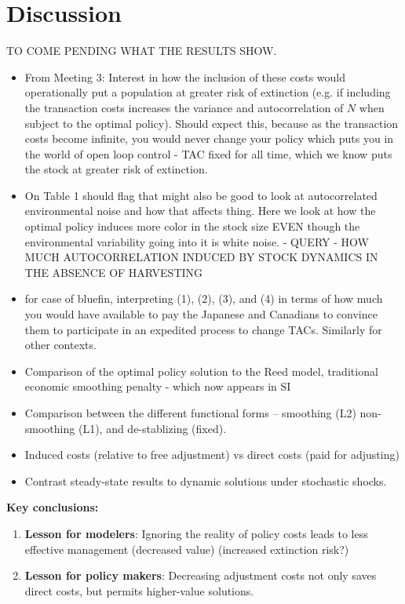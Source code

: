 \documentclass{article}\usepackage[]{graphicx}\usepackage[]{color}
\begin{document}
\section{Discussion}
TO COME PENDING WHAT THE RESULTS SHOW.
\begin{itemize}
\item From Meeting 3: Interest in how the inclusion of these costs would operationally put a population at greater risk of extinction (e.g. if including the transaction costs increases the variance and autocorrelation of $N$ when subject to the optimal policy). Should expect this, because as the transaction costs become infinite, you would never change your policy which puts you in the world of open loop control - TAC fixed for all time, which we know puts the stock at greater risk of extinction.
\item On Table 1 should flag that might also be good to look at autocorrelated environmental noise and how that affects thing. Here we look at how the optimal policy induces more color in the stock size EVEN though the environmental variability going into it is white noise. - QUERY - HOW MUCH AUTOCORRELATION INDUCED BY STOCK DYNAMICS IN THE ABSENCE OF HARVESTING
\item for case of bluefin, interpreting  (1), (2), (3), and (4) in terms of how much you would have available to pay the Japanese and Canadians to convince them to participate in an expedited process to change TACs. Similarly for other contexts.
\item   Comparison of the optimal policy solution to the Reed model, traditional economic smoothing penalty - which now appears in SI
\item  Comparison between the different functional forms -- smoothing (L2)
  non-smoothing (L1), and de-stablizing (fixed).
\item   Induced costs (relative to free adjustment) vs direct costs (paid for adjusting) 
\item   Contrast steady-state results to dynamic solutions under stochastic shocks.
\end{itemize}

\textbf{Key conclusions:}
\begin{enumerate}
  \item \textbf{Lesson for modelers}: Ignoring the reality of policy costs leads to less effective management (decreased value)  (increased extinction risk?)
  \item \textbf{Lesson for policy makers}: Decreasing adjustment costs not only saves direct costs, but permits higher-value solutions.
\end{enumerate}
\end{document}
